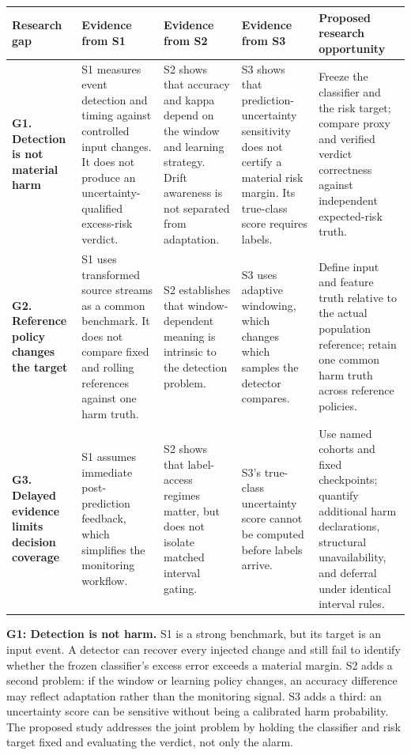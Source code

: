 \documentclass[
]{article}
\begin{document}
\begin{longtable}[]{@{}
  >{\raggedright\arraybackslash}p{}
  >{\raggedright\arraybackslash}p{}
  >{\raggedright\arraybackslash}p{}
  >{\raggedright\arraybackslash}p{}
  >{\raggedright\arraybackslash}p{}@{}}
\toprule
Research gap & Evidence from S1 & Evidence from S2 & Evidence from S3 &
Proposed research opportunity \\
\midrule
\endhead
\textbf{G1. Detection is not material harm} & S1 measures event
detection and timing against controlled input changes. It does not
produce an uncertainty-qualified excess-risk verdict. & S2 shows that
accuracy and kappa depend on the window and learning strategy. Drift
awareness is not separated from adaptation. & S3 shows that
prediction-uncertainty sensitivity does not certify a material risk
margin. Its true-class score requires labels. & Freeze the classifier
and the risk target; compare proxy and verified verdict correctness
against independent expected-risk truth. \\
\textbf{G2. Reference policy changes the target} & S1 uses transformed
source streams as a common benchmark. It does not compare fixed and
rolling references against one harm truth. & S2 establishes that
window-dependent meaning is intrinsic to the detection problem. & S3
uses adaptive windowing, which changes which samples the detector
compares. & Define input and feature truth relative to the actual
population reference; retain one common harm truth across reference
policies. \\
\textbf{G3. Delayed evidence limits decision coverage} & S1 assumes
immediate post-prediction feedback, which simplifies the monitoring
workflow. & S2 shows that label-access regimes matter, but does not
isolate matched interval gating. & S3's true-class uncertainty score
cannot be computed before labels arrive. & Use named cohorts and fixed
checkpoints; quantify additional harm declarations, structural
unavailability, and deferral under identical interval rules. \\
\bottomrule
\end{longtable}

\textbf{G1: Detection is not harm.} S1 is a strong benchmark, but its
target is an input event. A detector can recover every injected change
and still fail to identify whether the frozen classifier's excess error
exceeds a material margin. S2 adds a second problem: if the window or
learning policy changes, an accuracy difference may reflect adaptation
rather than the monitoring signal. S3 adds a third: an uncertainty score
can be sensitive without being a calibrated harm probability. The
proposed study addresses the joint problem by holding the classifier and
risk target fixed and evaluating the verdict, not only the alarm.
\end{document}

